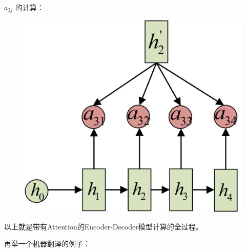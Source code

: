 \documentclass[12pt]{article}
\begin{document}
$a_{3j}$ 的计算：
\begin{figure}[H]
    \centering
    \includegraphics[width=.4\textwidth]{fig/Attention_Compute_A_3.jpg}
\end{figure}

以上就是带有Attention的Encoder-Decoder模型计算的全过程。


\begin{framed}
再举一个机器翻译的例子\cite{Attention_Detail_In_Seq2Seq}：


\end{framed}
\end{document}
